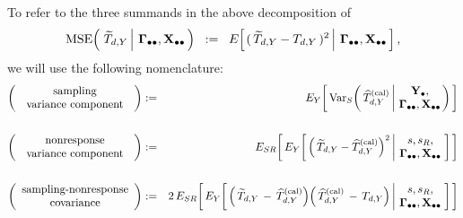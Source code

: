 \vskip 0.75cm
\noindent
To refer to the three summands in the above decomposition of
\begin{equation*}
\textnormal{MSE}\!\left(\,
    \left.
    \widetilde{T}_{d,Y}
    \,\right\vert\,
    \mathbf{\Gamma}_{\bullet\bullet},\mathbf{X}_{\bullet\bullet}
    \,\right)
\;\; := \;\;
    E\!\left[
        \left.
        (\,\widetilde{T}_{d,Y} - T_{d,Y}\,)^{2}
        \,\right\vert\,
        \mathbf{\Gamma}_{\bullet\bullet},\mathbf{X}_{\bullet\bullet}
        \,\right],
\end{equation*}
we will use the following nomenclature:
\vskip 0.01cm
\begin{eqnarray*}
\left(\begin{array}{c}
    \textnormal{sampling}
    \\
    \textnormal{\;\,variance component\;\,}
    \end{array}\right)
& := &
    E_{Y}\!\left[\,
        \Var_{S}\!\left(\,
            \widehat{T}^{\textnormal{(cal)}}_{d,Y}
            \left\vert\!
            \begin{array}{c} \Ydot, \\ \Gdotdot,\Xobs \end{array}
            \right.
            \!\!\!\right)
        \,\right]
\\ \\
\left(\begin{array}{c}
    \textnormal{nonresponse}
    \\
    \textnormal{\;\,variance component\;\,}
    \end{array}\right)
& := &
    E_{SR}\!\left[\,
    E_{Y}\!\left[\,
        \left(\,\widetilde{T}_{d,Y} - \widehat{T}^{\textnormal{(cal)}}_{d,Y}\right)^{2}
        \left\vert\!
        \begin{array}{c} s,s_{R}, \\ \Gdotdot,\Xobs \end{array}
        \right.
        \!\!\right]
        \,\right]
\\ \\
\left(\begin{array}{c}
    \textnormal{sampling-nonresponse}
    \\
    \textnormal{covariance}
    \end{array}\right)
& := &
    2 \,
    E_{SR}\!\left[\,
    E_{Y}\!\left[\,
        \left(\,\widetilde{T}_{d,Y} \,-\, \widehat{T}^{\textnormal{(cal)}}_{d,Y}\right)
        \!
        \left(\,\widehat{T}^{\textnormal{(cal)}}_{d,Y} \,-\, T_{d,Y}\right)
        \left\vert\!
        \begin{array}{c} s,s_{R}, \\ \Gdotdot,\Xobs \end{array}
        \right.
        \!\!\right]
        \,\right]
\end{eqnarray*}

